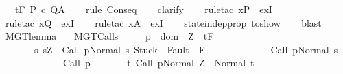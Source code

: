 \begin{isabellebody}
\ \ \ {\isachardoublequoteopen}{\isasymGamma}{\isacharcomma}{\isasymTheta}{\isasymturnstile}\isactrlsub t\isactrlbsub {\isacharslash}F\isactrlesub \ P\ c\ Q{\isacharcomma}A{\isachardoublequoteclose}\isanewline
%
\isadelimproof
\ \ %
\endisadelimproof
%
\isatagproof
{}\isamarkupfalse%
\ {\isacharparenleft}rule\ Conseq{\isacharparenright}\isanewline
\ \ \isamarkupfalse%
\ {\isacharparenleft}clarify{\isacharparenright}\isanewline
\ \ \isamarkupfalse%
\ {\isacharparenleft}rule{\isacharunderscore}tac\ x{\isacharequal}{\isachardoublequoteopen}P{\isachardoublequoteclose}\ \ exI{\isacharparenright}\isanewline
\ \ \isamarkupfalse%
\ {\isacharparenleft}rule{\isacharunderscore}tac\ x{\isacharequal}{\isachardoublequoteopen}Q{\isachardoublequoteclose}\ \ exI{\isacharparenright}\isanewline
\ \ \isamarkupfalse%
\ {\isacharparenleft}rule{\isacharunderscore}tac\ x{\isacharequal}{\isachardoublequoteopen}A{\isachardoublequoteclose}\ \ exI{\isacharparenright}\isanewline
\ \ \isamarkupfalse%
\ state{\isacharunderscore}indep{\isacharunderscore}prop\ to{\isacharunderscore}show\isanewline
\ \ \isamarkupfalse%
\ blast%
\endisatagproof
{\isafoldproof}%
%
\isadelimproof
\isanewline
%
\endisadelimproof
\isanewline
{}\isamarkupfalse%
\ MGT{\isacharunderscore}lemma{\isacharcolon}\isanewline
\ \ \ MGT{\isacharunderscore}Calls{\isacharcolon}\ \isanewline
\ \ \ \ {\isachardoublequoteopen}{\isasymforall}p\ {\isasymin}\ dom\ {\isasymGamma}{\isachardot}\ {\isasymforall}Z{\isachardot}\ {\isasymGamma}{\isacharcomma}{\isasymTheta}\ {\isasymturnstile}\isactrlsub t\isactrlbsub {\isacharslash}F\isactrlesub \ \isanewline
\ \ \ \ \ \ \ {\isacharbraceleft}s{\isachardot}\ s{\isacharequal}Z\ {\isasymand}\ {\isasymGamma}{\isasymturnstile}{\isasymlangle}Call\ p{\isacharcomma}Normal\ s{\isasymrangle}\ {\isasymRightarrow}{\isasymnotin}{\isacharparenleft}{\isacharbraceleft}Stuck{\isacharbraceright}\ {\isasymunion}\ Fault\ {\isacharbackquote}\ {\isacharparenleft}{\isacharminus}F{\isacharparenright}{\isacharparenright}\ {\isasymand}\ \isanewline
\ \ \ \ \ \ \ \ \ \ \ {\isasymGamma}{\isasymturnstile}{\isacharparenleft}Call\ p{\isacharparenright}{\isasymdown}Normal\ s{\isacharbraceright}\isanewline
\ \ \ \ \ \ \ \ \ \ \ \ \ {\isacharparenleft}Call\ p{\isacharparenright}\isanewline
\ \ \ \ \ \ \ {\isacharbraceleft}t{\isachardot}\ {\isasymGamma}{\isasymturnstile}{\isasymlangle}Call\ p{\isacharcomma}Normal\ Z{\isasymrangle}\ {\isasymRightarrow}\ Normal\ t{\isacharbraceright}{\isacharcomma}\isanewline

\end{isabellebody}
